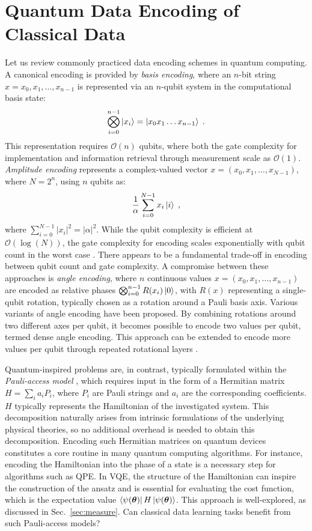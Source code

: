 \documentclass[../main.tex]{subfiles}
\begin{document}
\section{Quantum Data Encoding of Classical Data}

Let us review commonly practiced data encoding schemes in quantum computing. A canonical encoding is provided by \textit{basis encoding}, where an $n$-bit string $x = x_0, x_1, \dots, x_{n-1}$ is represented via an $n$-qubit system in the computational basis state: 
\begin{equation} 
    \bigotimes_{i=0}^{n-1} \ket{x_i} = \ket{x_0 x_1\dots x_{n-1}} \; .
\end{equation} This representation requires $\mathcal{O}(n)$ qubits, where both the gate complexity for implementation and information retrieval through measurement scale as $\mathcal{O}(1)$.
\textit{Amplitude encoding} represents a complex-valued vector $x = (x_0, x_1, \dots, x_{N-1})$, where $N = 2^n$, using $n$ qubits as: \begin{equation} \frac{1}{\alpha}\sum_{i=0}^{N-1} x_i \ket{i} \; , \end{equation} where $\sum_{i=0}^{N-1} |x_i|^2 = |\alpha|^2$. While the qubit complexity is efficient at $\mathcal{O}(\log(N))$, the gate complexity for encoding scales exponentially with qubit count in the worst case \cite{larose2020robust}.
There appears to be a fundamental trade-off in encoding between qubit count and gate complexity. A compromise between these approaches is \textit{angle encoding}, where $n$ continuous values $x = (x_0, x_1, \dots, x_{n-1})$ are encoded as relative phases $\bigotimes_{i=0}^{n-1} R(x_i) \ket{0}$, with $R(x)$ representing a single-qubit rotation, typically chosen as a rotation around a Pauli basis axis.
Various variants of angle encoding have been proposed. By combining rotations around two different axes per qubit, it becomes possible to encode two values per qubit, termed dense angle encoding. This approach can be extended to encode more values per qubit through repeated rotational layers \cite{grover2002creating}.


Quantum-inspired problems are, in contrast, typically formulated within the \textit{Pauli-access model} \cite{wang2024qubit}, which requires input in the form of a Hermitian matrix $H = \sum_{i} a_i P_i$, where $P_i$ are Pauli strings and $a_i$ are the corresponding coefficients. $H$ typically represents the Hamiltonian of the investigated system. This decomposition naturally arises from intrinsic formulations of the underlying physical theories, so no additional overhead is needed to obtain this decomposition. Encoding such Hermitian matrices on quantum devices constitutes a core routine in many quantum computing algorithms. For instance, encoding the Hamiltonian into the phase of a state is a necessary step for algorithms such as \ac{QPE}. In \ac{VQE}, the structure of the Hamiltonian can inspire the construction of the ansatz and is essential for evaluating the cost function, which is the expectation value $\bra{\psi (\bm{\theta})} H \ket{\psi (\bm{\theta})}$. This approach is well-explored, as discussed in Sec.~\ref{sec:measure}.
Can classical data learning tasks benefit from such Pauli-access models?
\end{document}
